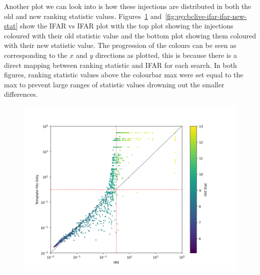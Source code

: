 %
Another plot we can look into is how these injections are distributed in both the old and new ranking statistic values. Figures~\ref{fig:pycbclive-ifar-ifar-old-stat} and~\ref{fig:pycbclive-ifar-ifar-new-stat} show the IFAR vs IFAR plot with the top plot showing the injections coloured with their old statistic value and the bottom plot showing them coloured with their new statistic value. The progression of the colours can be seen as corresponding to the $x$ and $y$ directions as plotted, this is because there is a direct mapping between ranking statistic and IFAR for each search. In both figures, ranking statistic values above the colourbar max were set equal to the max to prevent large ranges of statistic values drowning out the smaller differences.
%
\begin{figure}
  \centering
  \begin{minipage}[t]{1.0\linewidth}
  
    \includegraphics[width=1\textwidth]{images/pycbclive/ifar_vs_ifar_old_stat.png}
    \caption{}
    \label{fig:pycbclive-ifar-ifar-old-stat}
  
  

\end{minipage}
\end{figure}
